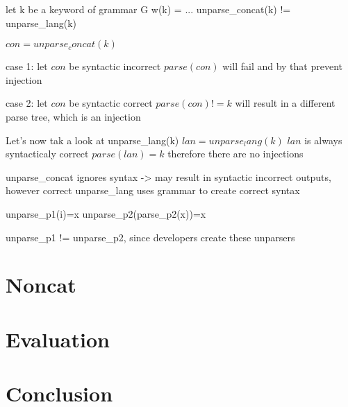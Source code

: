 \documentclass[conference]{IEEEtran}
\newcommand{\punchline}[1]{\textbf{Punch line: #1}}
\renewcommand{\punchline}[1]{}
\begin{document}
\punchline{definition shotgun unparser}
let k be a keyword of grammar G
w(k) = ...
unparse_concat(k) != unparse_lang(k)

$con=unparse_concat(k)$

case 1: let $con$ be syntactic incorrect
$parse(con)$ will fail and by that prevent injection

case 2: let $con$ be syntactic correct
$parse(con) != k$ will result in a different parse tree, which is an injection


Let's now tak a look at unparse_lang(k)
$lan = unparse_lang(k)$
$lan$ is always syntacticaly correct
$parse(lan) = k$ therefore there are no injections

unparse_concat ignores syntax -> may result in syntactic incorrect outputs, however correct 
unparse_lang uses grammar to create correct syntax

unparse_p1(i)=x
unparse_p2(parse_p2(x))=x


unparse_p1 != unparse_p2, since developers create these unparsers

\section{Noncat}\label{sec:mchc}


\section{Evaluation}
\section{Conclusion} \label{sec:conclusion}




\end{document}
